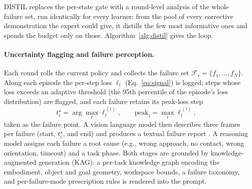 \documentclass[letterpaper]{article} %
\begin{document}
DISTIL replaces the per-state gate with a round-level analysis of the whole
failure set, run identically for every learner: from the pool of every
corrective demonstration the expert could give, it distills the few most
informative ones and spends the budget only on those.
Algorithm~\ref{alg:distil} gives the loop.

\paragraph{Uncertainty flagging and failure perception.}
Each round rolls the current policy and collects the failure set
$\mathcal{F}_r=\{f_1,\dots,f_N\}$. Along each episode the per-step loss
$\ell_t$ (Eq.~\ref{eq:signal}) is logged; steps whose loss exceeds an
adaptive threshold (the 95th percentile of the episode's loss distribution)
are flagged, and each failure retains its peak-loss step
\begin{equation}
t^\star_i=\arg\max_t \ell^{\,(i)}_t,
\qquad
\mathrm{peak}_i=\max_t \ell^{\,(i)}_t,
\label{eq:flag}
\end{equation}
taken as the failure point. A
vision language model then describes three frames per
failure (start, $t^\star_i$, and end) and produces a textual failure report
\citep{bai2025qwen3vl,liu2023reflect,duan2025aha}. A reasoning model
\citep{yang2025qwen3} assigns each failure a root cause (e.g., wrong
approach, no contact, wrong orientation, timeout) and a task phase. Both
stages are grounded by knowledge-augmented generation (KAG): a per-task
knowledge graph encoding the embodiment, object and goal geometry, workspace
bounds, a failure taxonomy, and per-failure-mode prescription rules is
rendered into the prompt.
\end{document}
